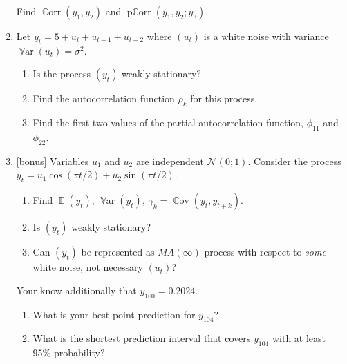 \documentclass[12pt]{article}
\DeclareMathOperator{\Cov}{\mathbb{C}ov}
\DeclareMathOperator{\Corr}{\mathbb{C}orr}
\DeclareMathOperator{\Var}{\mathbb{V}ar}
\DeclareMathOperator{\E}{\mathbb{E}}
\DeclareMathOperator{\pCorr}{\mathrm{p}\mathbb{C}\mathrm{orr}}
\newcommand \cN{\mathcal{N}}
\begin{document}
\begin{enumerate}
  Find $\Corr(y_1, y_2)$ and $\pCorr(y_1, y_2 ; y_3)$.

  \item Let $y_t = 5 + u_t + u_{t-1} + u_{t-2}$ where $(u_t)$ is a white noise with variance $\Var(u_t) = \sigma^2$.
  \begin{enumerate}
    \item Is the process $(y_t)$ weakly stationary?
    \item Find the autocorrelation function $\rho_k$ for this process. 
    \item Find the first two values of the partial autocorrelation function, $\phi_{11}$ and $\phi_{22}$.
  \end{enumerate}

  \item {[bonus]} Variables $u_1$ and $u_2$ are independent $\cN(0;1)$. 
  Consider the process $y_t = u_1 \cos (\pi t /2) + u_2 \sin (\pi t /2)$.

  \begin{enumerate}
    \item Find $\E(y_t)$, $\Var(y_t)$, $\gamma_k = \Cov(y_t, y_{t+k})$. 
    \item Is $(y_t)$ weakly stationary? 
    \item Can $(y_t)$ be represented as $MA(\infty)$ process with respect to \textit{some} white noise, not necessary $(u_t)$?
  \end{enumerate}

  Your know additionally that $y_{100} = 0.2024$. 
  \begin{enumerate}[resume]
    \item What is your best point prediction for $y_{104}$? 
    \item What is the shortest prediction interval that covers $y_{104}$ with at least 95\%-probability?
  \end{enumerate}


\end{enumerate}
\end{document}
